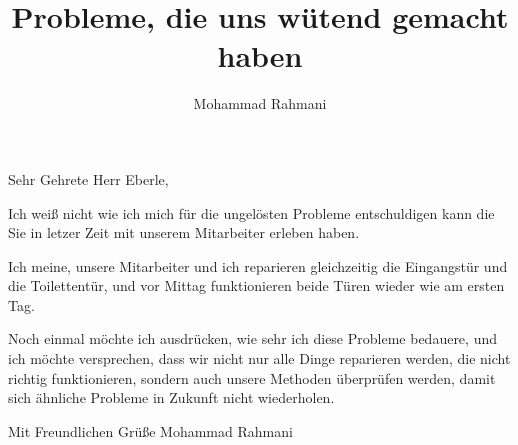 \documentclass[a4paper]{article}
\title{Probleme, die uns wütend gemacht haben}
\date{}
\author{Mohammad Rahmani}
\begin{document}
\maketitle
    Sehr Gehrete Herr Eberle,

    Ich weiß nicht wie ich mich für die ungelösten Probleme entschuldigen kann die Sie in letzer Zeit mit unserem Mitarbeiter erleben haben.
    
    Ich meine, unsere Mitarbeiter und ich reparieren gleichzeitig die Eingangstür und die Toilettentür, und vor Mittag funktionieren beide Türen wieder wie am ersten Tag.
    
    Noch einmal möchte ich ausdrücken, wie sehr ich diese Probleme bedauere, und ich möchte versprechen, dass wir nicht nur alle Dinge reparieren werden, die nicht richtig funktionieren, sondern auch unsere Methoden überprüfen werden, damit sich ähnliche Probleme in Zukunft nicht wiederholen.

    Mit Freundlichen Grüße
    Mohammad Rahmani
    
    
\end{document}
